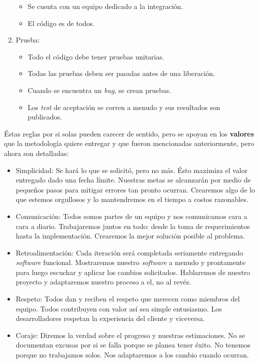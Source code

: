 \begin{enumerate}
\begin{itemize}
	\item Se cuenta con un equipo dedicado a la integración.
	\item El código es de todos.
	\end{itemize}
\item Prueba:
	\begin{itemize}
	\item Todo el código debe tener pruebas unitarias.
	\item Todas las pruebas deben ser pasadas antes de una liberación.
	\item Cuando se encuentra un \textit{bug}, se crean pruebas.
	\item Los \textit{test} de aceptación se corren a menudo y sus resultados son publicados.
	\end{itemize}
\end{enumerate}

Éstas reglas por si solas pueden carecer de sentido, pero se apoyan en los \textbf{valores} que la metodología quiere entregar y que fueron mencionadas anteriormente, pero ahora son detalladas:

\begin{itemize}
\item Simplicidad: Se hará lo que se solicitó, pero no más. Ésto maximiza el valor entregado dado una fecha límite. Nuestras metas se alcanzarán por medio de pequeños pasos para mitigar errores tan pronto ocurran. Crearemos algo de lo que estemos orgullosos y lo mantendremos en el tiempo a costos razonables.
\item Comunicación: Todos somos partes de un equipo y nos comunicamos cara a cara a diario. Trabajaremos juntos en todo: desde la toma de requerimientos hasta la implementación. Crearemos la mejor solución posible al problema.
\item Retroalimentación: Cada iteración será completada seriamente entregando \textit{software} funcional. Mostraremos nuestro \textit{software} a menudo y prontamente para luego escuchar y aplicar los cambios solicitados. Hablaremos de nuestro proyecto y adaptaremos nuestro proceso a el, no al revéz.
\item Respeto: Todos dan y reciben el respeto que merecen como miembros del equipo. Todos contribuyen con valor así sea simple entusiasmo. Los desarrolladores respetan la experiencia del cliente y viceversa. 
\item Coraje: Diremos la verdad sobre el progreso y nuestras estimaciones. No se documentan excusas por si se falla porque se planea tener éxito. No tenemos porque no trabajamos solos. Nos adaptaremos a los cambio cuando ocurran.
\end{itemize}

